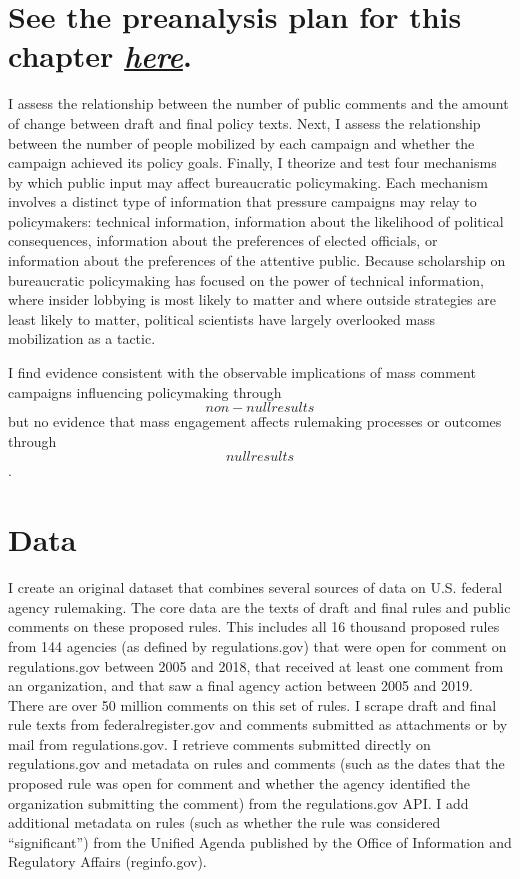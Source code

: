 \documentclass[
]{book}
\begin{document}
\hypertarget{see-the-preanalysis-plan-for-this-chapter-here.}{%
\section{\texorpdfstring{See the preanalysis plan for this chapter \href{https://github.com/judgelord/dissertation/blob/master/04-influence/preanalysis.pdf}{\emph{here}}.}{See the preanalysis plan for this chapter here.}}\label{see-the-preanalysis-plan-for-this-chapter-here.}}

I assess the relationship between the number of
public comments and the amount of change between draft and final policy
texts. Next, I assess the relationship between the number of people
mobilized by each campaign and whether the campaign achieved its policy
goals. Finally, I theorize and test four mechanisms by which public
input may affect bureaucratic policymaking. Each mechanism involves a
distinct type of information that pressure campaigns may relay to
policymakers: technical information, information about the likelihood of
political consequences, information about the preferences of elected
officials, or information about the preferences of the attentive public.
Because scholarship on bureaucratic policymaking has focused on the
power of technical information, where insider lobbying is most likely to
matter and where outside strategies are least likely to matter,
political scientists have largely overlooked mass mobilization as a
tactic.

I find evidence consistent with the observable implications of mass
comment campaigns influencing policymaking through \[non-null results\]
but no evidence that mass engagement affects rulemaking processes or
outcomes through \[null results\].

\hypertarget{data}{%
\section{Data}\label{data}}

I create an original dataset that combines several sources of data on U.S. federal agency rulemaking.
The core data are the texts of draft and final rules and public comments on these proposed rules.
This includes all 16 thousand proposed rules from 144 agencies (as defined by regulations.gov) that were open for comment on regulations.gov between 2005 and 2018, that received at least one comment from an organization, and that saw a final agency action between 2005 and 2019.
There are over 50 million comments on this set of rules.
I scrape draft and final rule texts from federalregister.gov and comments submitted as attachments or by mail from regulations.gov.
I retrieve comments submitted directly on regulations.gov and metadata on rules and comments (such as the dates that the proposed rule was open for comment and whether the agency identified the organization submitting the comment) from the regulations.gov API.
I add additional metadata on rules (such as whether the rule was considered ``significant'') from the Unified Agenda published by the Office of Information and Regulatory Affairs (reginfo.gov).
\end{document}
